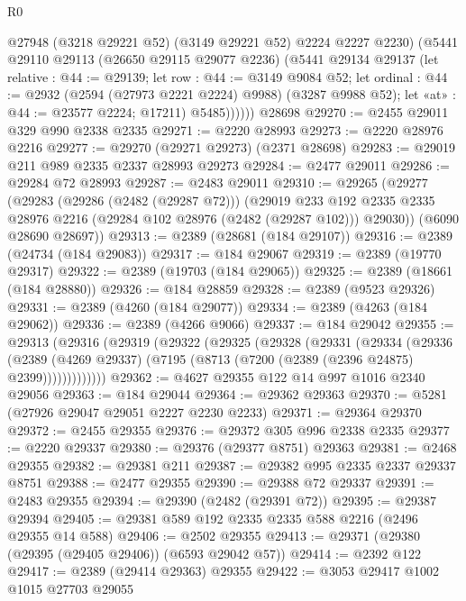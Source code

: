 \begin{lexlean}{R0}
\begin{coremodule}
            @27948 (@3218 @29221 @52) (@3149 @29221 @52) @2224 @2227 @2230)
            (@5441
              @29110
              @29113
              (@26650 @29115 @29077 @2236)
              (@5441
                @29134
                @29137
                (let relative : @44 := @29139;
                let row : @44 := @3149 @9084 @52;
                let ordinal : @44 := @2932 (@2594 (@27973 @2221 @2224) @9988) (@3287 @9988 @52);
                let «at» : @44 := @23577 @2224; @17211)
                @5485))))))
    @28698
@29270 := @2455 @29011 @329 @990 @2338 @2335
@29271 := @2220 @28993
@29273 := @2220 @28976 @2216
@29277 := @29270 (@29271 @29273) (@2371 @28698)
@29283 := @29019 @211 @989 @2335 @2337 @28993 @29273
@29284 := @2477 @29011
@29286 := @29284 @72 @28993
@29287 := @2483 @29011
@29310 := @29265
    (@29277
      (@29283
        (@29286 (@2482 (@29287 @72)))
        (@29019
          @233
          @192
          @2335
          @2335
          @28976
          @2216
          (@29284 @102 @28976 (@2482 (@29287 @102)))
          @29030))
      (@6090 @28690 @28697))
@29313 := @2389 (@28681 (@184 @29107))
@29316 := @2389 (@24734 (@184 @29083))
@29317 := @184 @29067
@29319 := @2389 (@19770 @29317)
@29322 := @2389 (@19703 (@184 @29065))
@29325 := @2389 (@18661 (@184 @28880))
@29326 := @184 @28859
@29328 := @2389 (@9523 @29326)
@29331 := @2389 (@4260 (@184 @29077))
@29334 := @2389 (@4263 (@184 @29062))
@29336 := @2389 (@4266 @9066)
@29337 := @184 @29042
@29355 := @29313
    (@29316
      (@29319
        (@29322
          (@29325
            (@29328
              (@29331
                (@29334
                  (@29336
                    (@2389
                      (@4269 @29337)
                      (@7195 (@8713 (@7200 (@2389 (@2396 @24875) @2399)))))))))))))
@29362 := @4627 @29355 @122 @14 @997 @1016 @2340 @29056
@29363 := @184 @29044
@29364 := @29362 @29363
@29370 := @5281 (@27926 @29047 @29051 @2227 @2230 @2233)
@29371 := @29364 @29370
@29372 := @2455 @29355
@29376 := @29372 @305 @996 @2338 @2335
@29377 := @2220 @29337
@29380 := @29376 (@29377 @8751) @29363
@29381 := @2468 @29355
@29382 := @29381 @211
@29387 := @29382 @995 @2335 @2337 @29337 @8751
@29388 := @2477 @29355
@29390 := @29388 @72 @29337
@29391 := @2483 @29355
@29394 := @29390 (@2482 (@29391 @72))
@29395 := @29387 @29394
@29405 := @29381 @589 @192 @2335 @2335 @588 @2216 (@2496 @29355 @14 @588)
@29406 := @2502 @29355
@29413 := @29371 (@29380 (@29395 (@29405 @29406)) (@6593 @29042 @57))
@29414 := @2392 @122
@29417 := @2389 (@29414 @29363) @29355
@29422 := @3053 @29417 @1002 @1015 @27703 @29055

\end{coremodule}
\end{lexlean}
